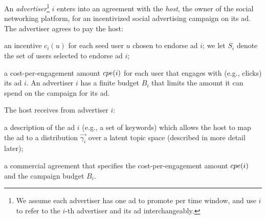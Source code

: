 
 An \emph{advertiser}\footnote{\scriptsize We assume each advertiser has one ad to promote per time window, and use $i$ to refer to the $i$-th advertiser and its ad interchangeably.} $i$ enters into an agreement with the \emph{host}, the owner of the social networking platform, for an incentivized social advertising campaign on its ad. The advertiser agrees to pay the host:
\squishdesc
\item[1.] an incentive $c_i(u)$ for each seed user $u$ chosen to endorse ad $i$; we let $S_i$ denote the set of users selected to endorse ad $i$;
\item[2.] a cost-per-engagement amount $cpe({i})$ for each user that engages with (e.g., clicks) its ad $i$.
\squishend
An advertiser $i$ has a finite budget $B_i$ that limits the amount it can spend on the campaign for its ad.
%
%

The host receives from advertiser $i$:

\squishdesc
\item[1.] a description of the ad $i$ (e.g., a set of keywords) which allows the host to map the ad to a distribution $\vec{\gamma_i}$ over a latent topic space (described in more detail later);
\item[2.] a commercial agreement that specifies the cost-per-engagement amount $cpe({i})$ and the campaign budget $B_i$.
\squishend

